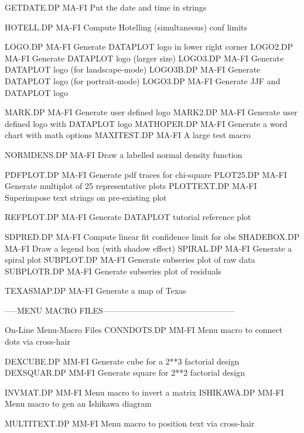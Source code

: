 GETDATE.DP                  MA-FI Put the date and time in strings

HOTELL.DP                   MA-FI Compute Hotelling (simultaneous) conf limits

LOGO.DP                     MA-FI Generate DATAPLOT logo in lower right corner
LOGO2.DP                    MA-FI Generate DATAPLOT logo (larger size)
LOGO3.DP                    MA-FI Generate DATAPLOT logo (for landscape-mode)
LOGO3B.DP                   MA-FI Generate DATAPLOT logo (for portrait-mode)
LOGO3.DP                    MA-FI Generate JJF and DATAPLOT logo

MARK.DP                     MA-FI Generate user defined logo
MARK2.DP                    MA-FI Generate user defined logo with DATAPLOT logo
MATHOPER.DP                 MA-FI Generate a word chart with math options
MAXITEST.DP                 MA-FI A large test macro

NORMDENS.DP                 MA-FI Draw a labelled normal density function

PDFPLOT.DP                  MA-FI Generate pdf traces for chi-square 
PLOT25.DP                   MA-FI Generate multiplot of 25 representative plots
PLOTTEXT.DP                 MA-FI Superimpose text strings on pre-existing plot

REFPLOT.DP                  MA-FI Generate DATAPLOT tutorial reference plot

SDPRED.DP                   MA-FI Compute linear fit confidence limit for obs
SHADEBOX.DP                 MA-FI Draw a legend box (with shadow effect)
SPIRAL.DP                   MA-FI Generate a spiral plot
SUBPLOT.DP                  MA-FI Generate subseries plot of raw data
SUBPLOTR.DP                 MA-FI Generate subseries plot of residuals

TEXASMAP.DP                 MA-FI Generate a map of Texas

-----MENU MACRO FILES------------------------------------------------

On-Line Menu-Macro Files
CONNDOTS.DP                 MM-FI Menu macro to connect dots via cross-hair

DEXCUBE.DP                  MM-FI Generate cube for a 2**3 factorial design
DEXSQUAR.DP                 MM-FI Generate square for 2**2 factorial design

INVMAT.DP                   MM-FI Menu macro to invert a matrix
ISHIKAWA.DP                 MM-FI Menu macro to gen an Ishikawa diagram

MULTITEXT.DP                MM-FI Menu macro to position text via cross-hair

